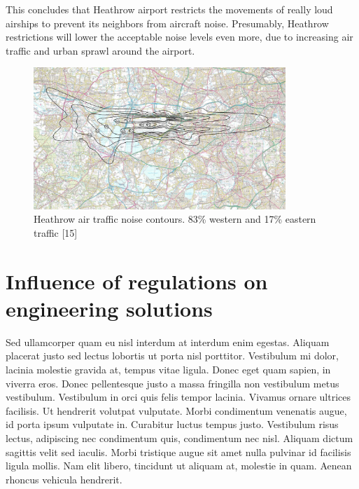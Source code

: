 This concludes that Heathrow airport restricts the movements of really loud airships to prevent its neighbors from aircraft noise. Presumably, Heathrow restrictions will lower the acceptable noise levels even more, due to increasing air traffic and urban sprawl around the airport.

\begin{figure}[h!]
\centering %
\includegraphics[width=0.85\textwidth]{Pictures/heathrow.png}
\caption{Heathrow air traffic noise contours. 83\% western and 17\% eastern traffic [15]}
\label{heathrow}
\end{figure}

\section{Influence of regulations on engineering solutions}

Sed ullamcorper quam eu nisl interdum at interdum enim egestas. Aliquam placerat justo sed lectus lobortis ut porta nisl porttitor. Vestibulum mi dolor, lacinia molestie gravida at, tempus vitae ligula. Donec eget quam sapien, in viverra eros. Donec pellentesque justo a massa fringilla non vestibulum metus vestibulum. Vestibulum in orci quis felis tempor lacinia. Vivamus ornare ultrices facilisis. Ut hendrerit volutpat vulputate. Morbi condimentum venenatis augue, id porta ipsum vulputate in. Curabitur luctus tempus justo. Vestibulum risus lectus, adipiscing nec condimentum quis, condimentum nec nisl. Aliquam dictum sagittis velit sed iaculis. Morbi tristique augue sit amet nulla pulvinar id facilisis ligula mollis. Nam elit libero, tincidunt ut aliquam at, molestie in quam. Aenean rhoncus vehicula hendrerit.